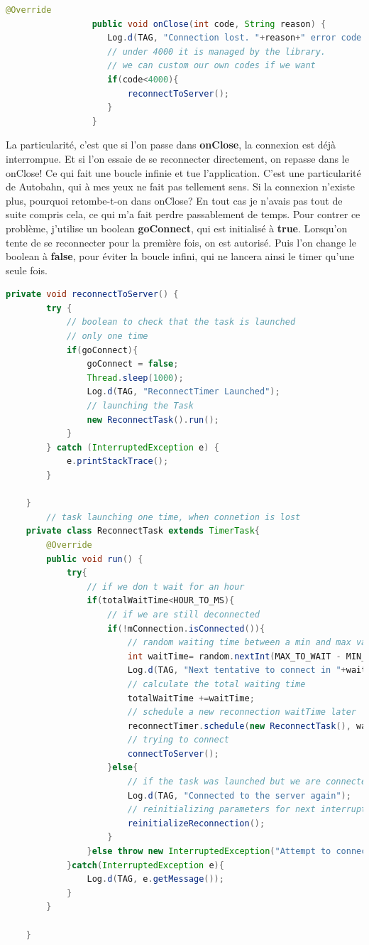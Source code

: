 \begin{lstlisting}[language=Java, caption={Code onClose Android}]
    @Override
		         public void onClose(int code, String reason) {
		            Log.d(TAG, "Connection lost. "+reason+" error code : "+code);
		            // under 4000 it is managed by the library.
		            // we can custom our own codes if we want
		            if(code<4000){
		            	reconnectToServer();
		            }
		         }
\end{lstlisting}

La particularité, c'est que si l'on passe dans \textbf{onClose}, la connexion est déjà interrompue. Et si l'on essaie de se reconnecter directement, on repasse dans le onClose! Ce qui fait une boucle infinie et tue l'application. C'est une particularité de Autobahn, qui à mes yeux ne fait pas tellement sens. Si la connexion n'existe plus, pourquoi retombe-t-on dans onClose? En tout cas je n'avais pas tout de suite compris cela, ce qui m'a fait perdre passablement de temps. Pour contrer ce problème, j'utilise un boolean \textbf{goConnect}, qui est initialisé à \textbf{true}. Lorsqu'on tente de se reconnecter pour la première fois, on est autorisé. Puis l'on change le boolean à \textbf{false}, pour éviter la boucle infini, qui ne lancera ainsi le timer qu'une seule fois.

\begin{lstlisting}[language=Java, caption={Code de reconnexion au serveur}]
private void reconnectToServer() {
		try {
			// boolean to check that the task is launched
			// only one time
			if(goConnect){
				goConnect = false;
				Thread.sleep(1000);
				Log.d(TAG, "ReconnectTimer Launched");
				// launching the Task
				new ReconnectTask().run();
			}
		} catch (InterruptedException e) {
			e.printStackTrace();
		}
		
	}
		// task launching one time, when connetion is lost
	private class ReconnectTask extends TimerTask{
		@Override
		public void run() {
			try{
				// if we don t wait for an hour
				if(totalWaitTime<HOUR_TO_MS){
					// if we are still deconnected
					if(!mConnection.isConnected()){
						// random waiting time between a min and max value
						int waitTime= random.nextInt(MAX_TO_WAIT - MIN_TO_WAIT + 1) + MIN_TO_WAIT;
						Log.d(TAG, "Next tentative to connect in "+waitTime+" ms");
						// calculate the total waiting time
						totalWaitTime +=waitTime;
						// schedule a new reconnection waitTime later
						reconnectTimer.schedule(new ReconnectTask(), waitTime);
						// trying to connect
						connectToServer();
					}else{
						// if the task was launched but we are connected now
						Log.d(TAG, "Connected to the server again");
						// reinitializing parameters for next interruption
						reinitializeReconnection();
					}
				}else throw new InterruptedException("Attempt to connect to the server during 1 hours without success");
			}catch(InterruptedException e){
				Log.d(TAG, e.getMessage());
			}
		}
		
	}
\end{lstlisting}

